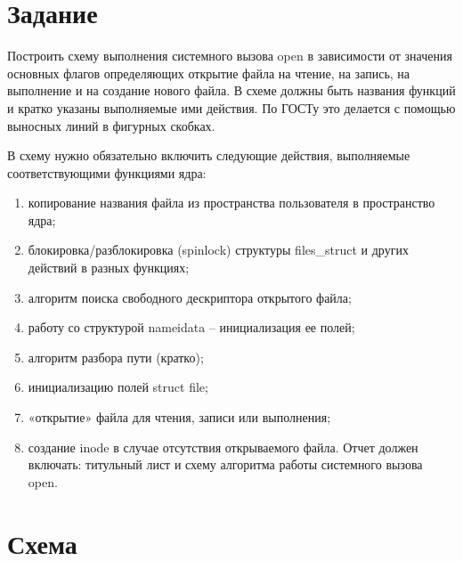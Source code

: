 \chapter{Задание}

Построить схему выполнения системного вызова open в зависимости от значения основных флагов определяющих открытие файла на чтение, на запись, на выполнение и на создание нового файла. В схеме должны быть названия функций и кратко указаны выполняемые ими действия. По ГОСТу это делается с помощью выносных линий в фигурных скобках.

В схему нужно обязательно включить следующие действия, выполняемые соответствующими функциями ядра:

\begin{enumerate}[label=\arabic*)]
    \item копирование названия файла из пространства пользователя в пространство ядра;
\item блокировка/разблокировка (spinlock) структуры files\_struct и других действий в разных функциях;
    \item алгоритм поиска свободного дескриптора открытого файла;
    \item работу со структурой nameidata – инициализация ее полей;
    \item алгоритм разбора пути (кратко);
    \item инициализацию полей struct file;
    \item «открытие» файла для чтения, записи или выполнения;
    \item создание inode в случае отсутствия открываемого файла.
Отчет должен включать: титульный лист и схему алгоритма работы
системного вызова open.
\end{enumerate}

\chapter{Схема}

